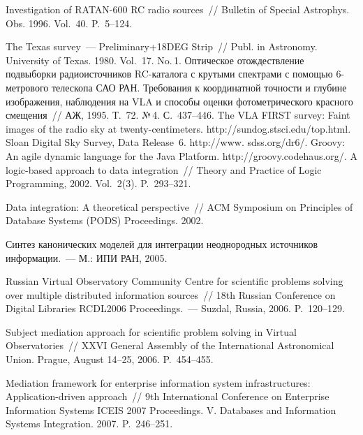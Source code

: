 \begin{multicols}{2}
{{\begin{thebibliography}{99}
Investigation of RATAN-600 RC radio sources~// Bulletin of  Special Astrophys. Obs. 1996.
Vol.~40. P.~5--124.

The Texas survey~--- Preliminary\;+\;18DEG Strip~// Publ. in Astronomy. University of Texas.
1980. Vol.~17. No.\,1.
Оптическое отождествление подвыборки радиоисточников RC-каталога с крутыми
спектрами с помощью 6-мет\-ро\-во\-го телескопа САО РАН. Требования к координатной
точности и глубине изображения, наблюдения на VLA и способы оценки
фотометрического красного смещения~// АЖ, 1995. Т.~72. №\,4. С.~437--446.
The VLA FIRST survey: Faint images of the radio sky at twenty-centimeters.  {\sf
http://sundog.stsci.edu/top.html}.
Sloan Digital Sky Survey, Data Release~6. {\sf http://www. sdss.org/dr6/}.
Groovy: An agile dynamic language for the Java Platform. {\sf http://groovy.codehaus.org/}.
A logic-based approach to data integration~// Theory and Practice of Logic Programming, 2002.
Vol.~2(3). P.~293--321.

Data integration: A theoretical perspective~// ACM Symposium on Principles of Database
Systems (PODS) Proceedings. 2002.

Синтез канонических моделей для интеграции неоднородных источников
информации.~--- М.: ИПИ РАН, 2005.

Russian Virtual Observatory Community Centre for scientific problems solving over multiple
distributed information sources~// 18th Russian Conference on Digital Libraries RCDL2006
Proceedings.~--- Suzdal, Russia, 2006. P.~120--129.

Subject mediation approach for scientific problem solving in Virtual Observatories~// XXVI
General Assembly of the International Astronomical Union. Prague, August 14--25, 2006.
P.~454--455.

Mediation \mbox{framework} for enterprise information system infrastructures: Application-driven
approach~// 9th International Conference on Enterprise Information Systems ICEIS 2007
Proceedings.  V. Databases and Information Systems Integration. 2007. P.~246--251.


\end{thebibliography}}}
\end{multicols}
